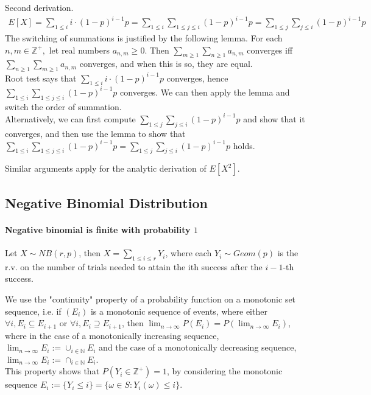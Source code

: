 \documentclass{article}
\begin{document}
Second derivation.
\begin{align*}
	E[X] = \sum_{1\leq i}i\cdot (1-p)^{i-1}p = \sum_{1\leq i}\sum_{1\leq j\leq i}(1-p)^{i-1}p = \sum_{1\leq j}\sum_{j\leq i}(1-p)^{i-1}p
\end{align*}
The switching of summations is justified by the following lemma. For each $n,m \in \mathbb{Z}^+,$ let real numbers $a_{n,m}\geq 0$. Then $\sum_{m\geq 1}\sum_{n\geq 1}a_{n,m}$ converges iff $\sum_{n\geq 1}\sum_{m\geq 1}a_{n,m}$ converges, and when this is so, they are equal.\\
Root test says that $\sum_{1\leq i}i\cdot (1-p)^{i-1}p$ converges, hence $\sum_{1\leq i}\sum_{1\leq j\leq i}(1-p)^{i-1}p$ converges. We can then apply the lemma and switch the order of summation.\\
Alternatively, we can first compute $\sum_{1\leq j}\sum_{j\leq i}(1-p)^{i-1}p$ and show that it converges, and then use the lemma to show that $\sum_{1\leq i}\sum_{1\leq j\leq i}(1-p)^{i-1}p = \sum_{1\leq j}\sum_{j\leq i}(1-p)^{i-1}p$ holds.

Similar arguments apply for the analytic derivation of $E[X^2]$.

\subsection{Negative Binomial Distribution}
\paragraph{Negative binomial is finite with probability $1$}
Let $X\sim NB(r, p)$, then $X = \sum_{1\leq i\leq r}Y_i$, where each $Y_i\sim Geom(p)$ is the r.v. on the number of trials needed to attain the ith success after the $i-1$-th success.

We use the "continuity" property of a probability function on a monotonic set sequence, i.e. if $(E_i)$ is a monotonic sequence of events, where either $\forall i, E_i\subseteq E_{i+1}$ or $\forall i, E_i\supseteq E_{i+1}$, then $\lim_{n\rightarrow \infty}P(E_i) = P(\lim_{n\rightarrow \infty}E_i)$, where in the case of a monotonically increasing sequence, $\lim_{n\rightarrow \infty}E_i:=\cup_{i\in \mathbb{N}} E_i$ and the case of a monotonically decreasing sequence, $\lim_{n\rightarrow \infty}E_i:=\cap_{i\in \mathbb{N}} E_i$.\\
This property shows that $P(Y_i\in \mathbb{Z}^+) = 1$, by considering the monotonic sequence $E_i := \{Y_i\leq i\} = \{\omega \in S: Y_i(\omega) \leq i\}$.
\end{document}
